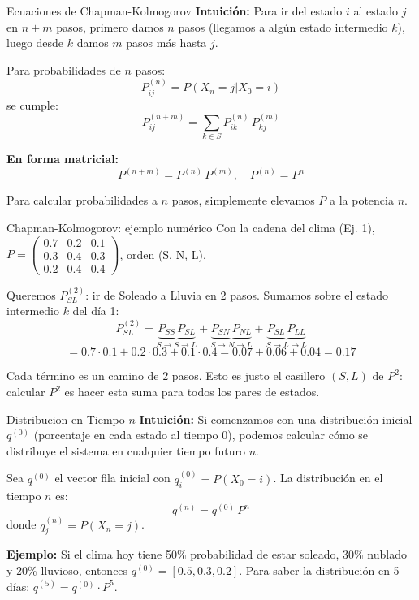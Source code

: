 \documentclass{beamer}
\begin{document}
\begin{frame}{Ecuaciones de Chapman-Kolmogorov}
    \small
    \textbf{Intuición:} Para ir del estado $i$ al estado $j$ en $n+m$ pasos, primero damos $n$ pasos (llegamos a algún estado intermedio $k$), luego desde $k$ damos $m$ pasos más hasta $j$.

    \vspace{0.5em}

    Para probabilidades de $n$ pasos:
    \[
    P_{ij}^{(n)} = P(X_n=j | X_0=i)
    \]
    se cumple:
    \[
    P_{ij}^{(n+m)} = \sum_{k\in S} P_{ik}^{(n)}\,P_{kj}^{(m)}
    \]

    \textbf{En forma matricial:}
    \[
    P^{(n+m)} = P^{(n)}\,P^{(m)},\quad P^{(n)} = P^n
    \]

    Para calcular probabilidades a $n$ pasos, simplemente elevamos $P$ a la potencia $n$.
\end{frame}

\begin{frame}{Chapman-Kolmogorov: ejemplo numérico}
    \small
    Con la cadena del clima (Ej. 1), $P = \begin{pmatrix} 0.7 & 0.2 & 0.1 \\ 0.3 & 0.4 & 0.3 \\ 0.2 & 0.4 & 0.4 \end{pmatrix}$, orden (S, N, L).

    \vspace{0.5em}

    Queremos $P_{SL}^{(2)}$: ir de Soleado a Lluvia en 2 pasos. Sumamos sobre el estado intermedio $k$ del día 1:
    \[
    P_{SL}^{(2)} = \underbrace{P_{SS}\,P_{SL}}_{S\to S\to L} + \underbrace{P_{SN}\,P_{NL}}_{S\to N\to L} + \underbrace{P_{SL}\,P_{LL}}_{S\to L\to L}
    \]
    \[
    = 0.7 \cdot 0.1 + 0.2 \cdot 0.3 + 0.1 \cdot 0.4 = 0.07 + 0.06 + 0.04 = 0.17
    \]

    \vspace{0.3em}

    Cada término es un camino de 2 pasos. Esto es justo el casillero $(S,L)$ de $P^2$: calcular $P^2$ es hacer esta suma para todos los pares de estados.
\end{frame}

\begin{frame}{Distribucion en Tiempo $n$}
    \small
    \textbf{Intuición:} Si comenzamos con una distribución inicial $q^{(0)}$ (porcentaje en cada estado al tiempo 0), podemos calcular cómo se distribuye el sistema en cualquier tiempo futuro $n$.

    \vspace{0.5em}

    Sea $q^{(0)}$ el vector fila inicial con $q^{(0)}_i=P(X_0=i)$. La distribución en el tiempo $n$ es:
    \[
    q^{(n)} = q^{(0)}\,P^n
    \]
    donde $q^{(n)}_j = P(X_n=j)$.

    \vspace{0.5em}

    \textbf{Ejemplo:} Si el clima hoy tiene 50\% probabilidad de estar soleado, 30\% nublado y 20\% lluvioso, entonces $q^{(0)} = [0.5, 0.3, 0.2]$. Para saber la distribución en 5 días: $q^{(5)} = q^{(0)} \cdot P^5$.
\end{frame}
\end{document}
